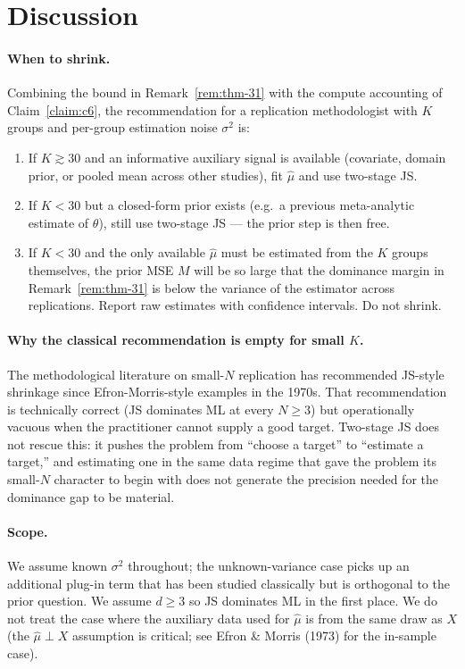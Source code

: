 \documentclass{rrxiv}
\begin{document}
\section{Discussion}
\label{sec:discussion}

\paragraph{When to shrink.} Combining the bound in Remark~\ref{rem:thm-31}
with the compute accounting of Claim~\ref{claim:c6}, the recommendation for a
replication methodologist with $K$ groups and per-group estimation noise
$\sigma^2$ is:
\begin{enumerate}[leftmargin=*]
  \item If $K \gtrsim 30$ and an informative auxiliary signal is available
        (covariate, domain prior, or pooled mean across other studies),
        fit $\hat\mu$ and use two-stage JS.
  \item If $K < 30$ but a closed-form prior exists (e.g.\ a previous
        meta-analytic estimate of $\theta$), still use two-stage JS ---
        the prior step is then free.
  \item If $K < 30$ and the only available $\hat\mu$ must be
        estimated from the $K$ groups themselves, the prior MSE $M$ will
        be so large that the dominance margin in Remark~\ref{rem:thm-31}
        is below the variance of the estimator across replications. Report
        raw estimates with confidence intervals. Do not shrink.
\end{enumerate}

\paragraph{Why the classical recommendation is empty for small $K$.} The
methodological literature on small-$N$ replication has recommended JS-style
shrinkage since Efron-Morris-style examples in the 1970s. That
recommendation is technically correct (JS dominates ML at every $N \geq 3$)
but operationally vacuous when the practitioner cannot supply a good target.
Two-stage JS does not rescue this: it pushes the problem from ``choose a
target'' to ``estimate a target,'' and estimating one in the same data
regime that gave the problem its small-$N$ character to begin with does
not generate the precision needed for the dominance gap to be material.

\paragraph{Scope.} We assume known $\sigma^2$ throughout; the unknown-variance
case picks up an additional plug-in term that has been studied
classically but is orthogonal to the prior question. We assume $d \geq 3$
so JS dominates ML in the first place. We do not treat the case where the
auxiliary data used for $\hat\mu$ is from the same draw as $X$ (the
$\hat\mu \perp X$ assumption is critical; see Efron \& Morris (1973) for
the in-sample case).
\end{document}
